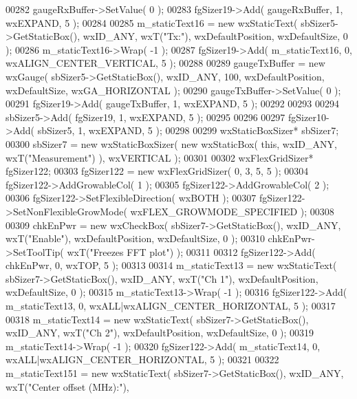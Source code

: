 \begin{DoxyCode}
00282     gaugeRxBuffer->SetValue( 0 ); 
00283     fgSizer19->Add( gaugeRxBuffer, 1, wxEXPAND, 5 );
00284     
00285     m_staticText16 = \textcolor{keyword}{new} wxStaticText( sbSizer5->GetStaticBox(), wxID\_ANY, wxT(\textcolor{stringliteral}{"Tx:"}), wxDefaultPosition, 
      wxDefaultSize, 0 );
00286     m_staticText16->Wrap( -1 );
00287     fgSizer19->Add( m_staticText16, 0, wxALIGN\_CENTER\_VERTICAL, 5 );
00288     
00289     gaugeTxBuffer = \textcolor{keyword}{new} wxGauge( sbSizer5->GetStaticBox(), wxID\_ANY, 100, wxDefaultPosition, wxDefaultSize,
       wxGA\_HORIZONTAL );
00290     gaugeTxBuffer->SetValue( 0 ); 
00291     fgSizer19->Add( gaugeTxBuffer, 1, wxEXPAND, 5 );
00292     
00293     
00294     sbSizer5->Add( fgSizer19, 1, wxEXPAND, 5 );
00295     
00296     
00297     fgSizer10->Add( sbSizer5, 1, wxEXPAND, 5 );
00298     
00299     wxStaticBoxSizer* sbSizer7;
00300     sbSizer7 = \textcolor{keyword}{new} wxStaticBoxSizer( \textcolor{keyword}{new} wxStaticBox( \textcolor{keyword}{this}, wxID\_ANY, wxT(\textcolor{stringliteral}{"Measurement"}) ), wxVERTICAL );
00301     
00302     wxFlexGridSizer* fgSizer122;
00303     fgSizer122 = \textcolor{keyword}{new} wxFlexGridSizer( 0, 3, 5, 5 );
00304     fgSizer122->AddGrowableCol( 1 );
00305     fgSizer122->AddGrowableCol( 2 );
00306     fgSizer122->SetFlexibleDirection( wxBOTH );
00307     fgSizer122->SetNonFlexibleGrowMode( wxFLEX\_GROWMODE\_SPECIFIED );
00308     
00309     chkEnPwr = \textcolor{keyword}{new} wxCheckBox( sbSizer7->GetStaticBox(), wxID\_ANY, wxT(\textcolor{stringliteral}{"Enable"}), wxDefaultPosition, 
      wxDefaultSize, 0 );
00310     chkEnPwr->SetToolTip( wxT(\textcolor{stringliteral}{"Freezes FFT plot"}) );
00311     
00312     fgSizer122->Add( chkEnPwr, 0, wxTOP, 5 );
00313     
00314     m_staticText13 = \textcolor{keyword}{new} wxStaticText( sbSizer7->GetStaticBox(), wxID\_ANY, wxT(\textcolor{stringliteral}{"Ch 1"}), wxDefaultPosition, 
      wxDefaultSize, 0 );
00315     m_staticText13->Wrap( -1 );
00316     fgSizer122->Add( m_staticText13, 0, wxALL|wxALIGN\_CENTER\_HORIZONTAL, 5 );
00317     
00318     m_staticText14 = \textcolor{keyword}{new} wxStaticText( sbSizer7->GetStaticBox(), wxID\_ANY, wxT(\textcolor{stringliteral}{"Ch 2"}), wxDefaultPosition, 
      wxDefaultSize, 0 );
00319     m_staticText14->Wrap( -1 );
00320     fgSizer122->Add( m_staticText14, 0, wxALL|wxALIGN\_CENTER\_HORIZONTAL, 5 );
00321     
00322     m_staticText151 = \textcolor{keyword}{new} wxStaticText( sbSizer7->GetStaticBox(), wxID\_ANY, wxT(\textcolor{stringliteral}{"Center offset (MHz):"}), 

\end{DoxyCode}
